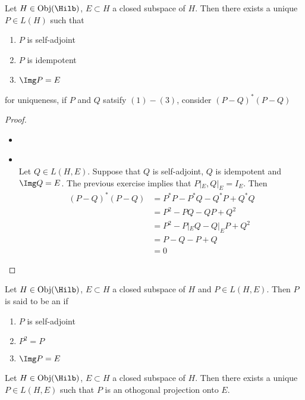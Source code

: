 \documentclass{book}
\begin{document}
\begin{ex}
	Let $H \in \Obj(\Hilb)$, $E \subset H$ a closed subspace of $H$. Then there exists a unique $P \in L(H)$ such that 
	\begin{enumerate}
		\item $P$ is self-adjoint
		\item $P$ is idempotent
		\item $\Img P = E$ 
	\end{enumerate}
	 for uniqueness, if $P$ and $Q$ satsify $(1)-(3)$, consider $(P - Q)^*(P - Q)$
\end{ex}

\begin{proof}\
	\begin{itemize}
		\item {} \\
		
		\item {} \\
		Let $Q \in L(H, E)$. Suppose that $Q$ is self-adjoint, $Q$ is idempotent and $\Img Q = E$. The previous exercise implies that $P|_E, Q|_E = I_E$. Then 
		\begin{align*}
			(P - Q)^*(P - Q)
			& = P^*P - P^*Q - Q^*P + Q^*Q \\
			& = P^2 - PQ - QP + Q^2 \\
			& = P^2 - P|_E Q - Q|_E P + Q^2 \\
			& = P - Q - P + Q \\
			& = 0
		\end{align*}
		
	\end{itemize}
\end{proof}

\begin{defn}
	Let $H \in \Obj(\Hilb)$, $E \subset H$ a closed subspace of $H$ and $P \in L(H, E)$. Then $P$ is said to be an  if 
	\begin{enumerate}
		\item $P$ is self-adjoint
		\item $P^2 = P$
		\item $\Img P = E$ 
	\end{enumerate}
\end{defn}

\begin{ex}
	Let $H \in \Obj(\Hilb)$, $E \subset H$ a closed subspace of $H$. Then there exists a unique $P \in L(H, E)$ such that $P$ is an othogonal projection onto $E$.
\end{ex}
\end{document}
